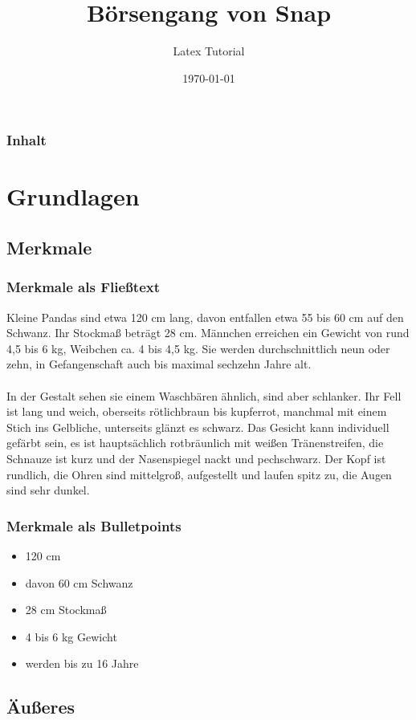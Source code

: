 \documentclass{beamer}
\title[Ailurus fulgens]{Börsengang von Snap}
\author{Latex Tutorial}
\institute[LT]{HTWK Leipzig}
\date{\today}
\begin{document}
\begin{frame}
\titlepage
\end{frame}

\begin{frame}

\frametitle{Inhalt}
\tableofcontents

\end{frame}

\section{Grundlagen}
\subsection{Merkmale}

\begin{frame}
\frametitle{Merkmale als Fließtext}

Kleine Pandas sind etwa 120 cm lang, davon entfallen etwa 55 bis 60 cm auf den Schwanz. Ihr Stockmaß beträgt 28 cm. Männchen erreichen ein Gewicht von rund 4,5 bis 6 kg, Weibchen ca. 4 bis 4,5 kg. Sie werden durchschnittlich neun oder zehn, in Gefangenschaft auch bis maximal sechzehn Jahre alt.\\~\\
In der Gestalt sehen sie einem Waschbären ähnlich, sind aber schlanker. Ihr Fell ist lang und weich, oberseits rötlichbraun bis kupferrot, manchmal mit einem Stich ins Gelbliche, unterseits glänzt es schwarz. Das Gesicht kann individuell gefärbt sein, es ist hauptsächlich rotbräunlich mit weißen Tränenstreifen, die Schnauze ist kurz und der Nasenspiegel nackt und pechschwarz. Der Kopf ist rundlich, die Ohren sind mittelgroß, aufgestellt und laufen spitz zu, die Augen sind sehr dunkel.
\end{frame}

\begin{frame}
\frametitle{Merkmale als Bulletpoints}
\begin{itemize}
\item 120 cm \pause
\item davon 60 cm Schwanz \pause
\item 28 cm Stockmaß \pause
\item 4 bis 6 kg Gewicht \pause
\item werden bis zu 16 Jahre 
\end{itemize}
\end{frame}


\subsection{Äußeres}
\end{document}
